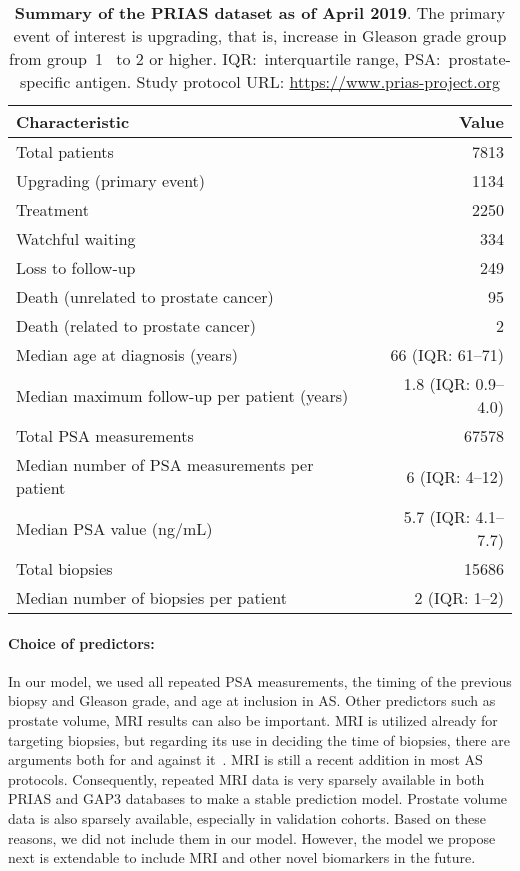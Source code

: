 \begin{table}
\small\sf\centering
\caption{\textbf{Summary of the PRIAS dataset as of April 2019}. The primary event of interest is upgrading, that is, increase in Gleason grade group from group~1~\citep{epsteinGG2014} to 2 or higher. IQR:~interquartile range, PSA:~prostate-specific antigen. Study protocol URL: \url{https://www.prias-project.org}}
\label{table:prias_summary}
\begin{tabular}{lr}
\toprule
\textbf{Characteristic} & \textbf{Value}\\
\midrule
Total patients & 7813\\
Upgrading (primary event) & 1134\\
Treatment & 2250\\
Watchful waiting & 334\\
Loss to follow-up & 249\\
Death (unrelated to prostate cancer) & 95\\
Death (related to prostate cancer) & 2\\
\midrule
Median age at diagnosis (years) & 66 (IQR: 61--71)\\
Median maximum follow-up per patient (years) &  1.8 (IQR: 0.9--4.0)\\
Total PSA measurements & 67578\\
Median number of PSA measurements per patient &  6 (IQR: 4--12)\\
Median PSA value (ng/mL) & 5.7 (IQR: 4.1--7.7)\\
Total biopsies & 15686\\
Median number of biopsies per patient &  2 (IQR: 1--2)\\
\bottomrule
\end{tabular}
\end{table}

\paragraph{Choice of predictors:} In our model, we used all repeated PSA measurements, the timing of the previous biopsy and Gleason grade, and age at inclusion in AS. Other predictors such as prostate volume, MRI results can also be important. MRI is utilized already for targeting biopsies, but regarding its use in deciding the time of biopsies, there are arguments both for and against it~\citep{kasivisvanathan2020magnetic,chesnut2019role,schoots2015magnetic}. MRI is still a recent addition in most AS protocols. Consequently, repeated MRI data is very sparsely available in both PRIAS and GAP3 databases to make a stable prediction model. Prostate volume data is also sparsely available, especially in validation cohorts. Based on these reasons, we did not include them in our model. However, the model we propose next is extendable to include MRI and other novel biomarkers in the future.